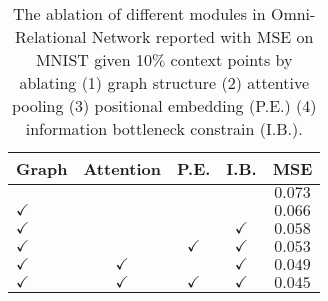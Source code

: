 \begin{table}
  \centering 
  \setlength{\tabcolsep}{5mm}
  \caption{The ablation of different modules in Omni-Relational Network reported with MSE on MNIST given 10$\%$ context points by ablating (1) graph structure (2) attentive pooling (3) positional embedding (P.E.) (4) information bottleneck constrain (I.B.).}
  \begin{tabular}{lcccc}
    \toprule
      Graph       & Attention       & P.E.            & I.B.             & MSE \\
    \midrule
                  &                 &                &                   & $0.073$\\
    $\checkmark$   &              &                 &                    & $0.066$\\
    $\checkmark$  &               &               &    $\checkmark$    & $0.058$\\
    $\checkmark$  &                 &   $\checkmark$     &  $\checkmark$   & $0.053$\\
    $\checkmark$  &  $\checkmark$  &               &     $\checkmark$   & $0.049$\\
    $\checkmark$  &  $\checkmark$  &   $\checkmark$    &  $\checkmark$   & $0.045$\\
    \bottomrule
  \end{tabular}
  \label{tab:3-ablation}
\end{table}
